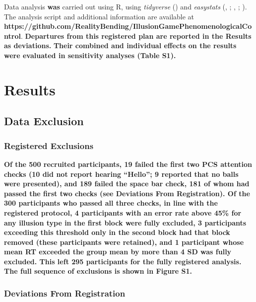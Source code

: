 \documentclass[
  man,
  floatsintext,
  longtable,
  nolmodern,
  notxfonts,
  notimes,
  colorlinks=true,linkcolor=blue,citecolor=blue,urlcolor=blue]{apa7}
\begin{document}
Data analysis \textbf{was} carried out using R, using \emph{tidyverse}
() and \emph{easystats}
(,
; , ;
). The analysis script and
additional information are available at
\textbf{https://github.com/RealityBending/IllusionGamePhenomenologicalControl}.
\textbf{Departures from this registered plan are reported in the Results
as deviations.} \textbf{Their combined and individual effects on the
results were evaluated in sensitivity analyses (Table S1).}

\section{Results}\label{results}

\subsection{Data Exclusion}\label{data-exclusion}

\subsubsection{Registered Exclusions}\label{registered-exclusions}

\textbf{Of the 500 recruited participants, 19 failed the first two PCS
attention checks (10 did not report hearing ``Hello''; 9 reported that
no balls were presented), and 189 failed the space bar check, 181 of
whom had passed the first two checks (see Deviations From Registration).
Of the 300 participants who passed all three checks, in line with the
registered protocol, 4 participants with an error rate above 45\% for
any illusion type in the first block were fully excluded, 3 participants
exceeding this threshold only in the second block had that block removed
(these participants were retained), and 1 participant whose mean RT
exceeded the group mean by more than 4 SD was fully excluded. This left
295 participants for the fully registered analysis. The full sequence of
exclusions is shown in Figure S1.}

\subsubsection{Deviations From
Registration}\label{deviations-from-registration}
\end{document}
